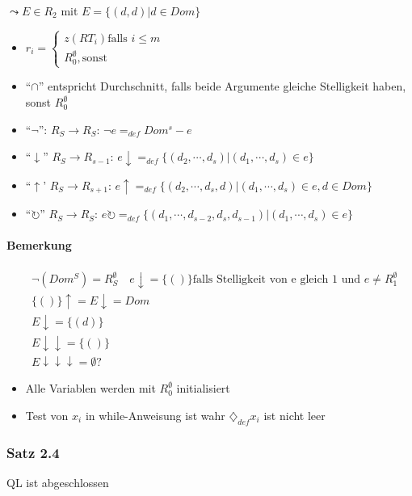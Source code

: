 \documentclass[12pt, a4paper]{article}
\begin{document}
$\leadsto E \in R_2$  mit $E = \{ (d,d) | d \in Dom \}$ \\

\begin{itemize}
\item $r_i = \begin{cases} z(RT_i) \text{falls } i \le m \\ R^\emptyset_0, \text{sonst} \end{cases}$
\item ``$\cap$'' entspricht Durchschnitt, falls beide Argumente gleiche Stelligkeit haben, sonst $R^\emptyset_0$
\item ``$\lnot$'': $R_S \rightarrow R_S$: $\lnot e =_{def} Dom^s - e$
\item ``$\downarrow$'' $R_S \rightarrow R_{s-1}$: $e\downarrow =_{def} \{ (d_2, \cdots, d_s) | (d_1, \cdots, d_s) \in e \}$
\item ``$\uparrow$' $R_S \rightarrow R_{s+1}$: $e\uparrow =_{def} \{ (d_2, \cdots, d_s, d) | (d_1, \cdots, d_s) \in e, d \in Dom \}$
\item ``$\circlearrowright$'' $R_S \rightarrow R_S$: $e\circlearrowright =_{def} \{ (d_1, \cdots, d_{s-2}, d_s, d_{s-1}) | (d_1, \cdots, d_s) \in e \}$
\end{itemize}

\paragraph{Bemerkung}
\begin{align*}
&\lnot (Dom^S) = R^\emptyset_S \quad e\downarrow = \{ () \} \text{falls Stelligkeit von e gleich 1 und } e \neq R^\emptyset_1 \\
&\{()\}\uparrow = E\downarrow = Dom \\
&E\downarrow = \{(d)\}\\
&E\downarrow\downarrow = \{()\}\\
& E\downarrow\downarrow\downarrow = \emptyset?
\end{align*}


\begin{itemize}
	\item Alle Variablen werden mit $R^\emptyset_0$ initialisiert
	\item Test von $x_i$ in while-Anweisung ist wahr $\diamondsuit_{def} x_i$ ist nicht leer
\end{itemize}


\subsubsection*{Satz 2.4} 
QL ist abgeschlossen
\end{document}
